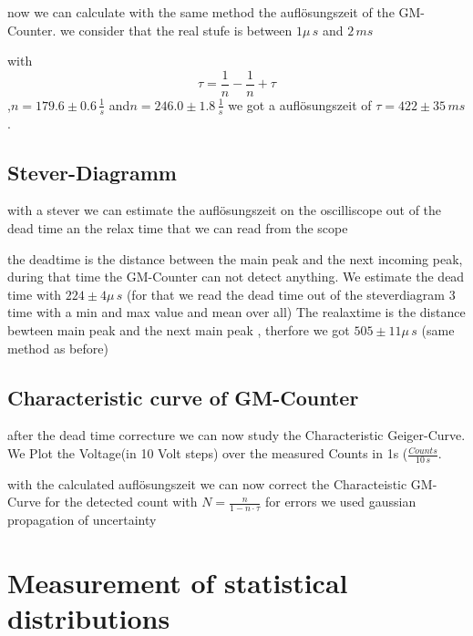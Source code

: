 now we can calculate with the same method the auflösungszeit of the GM-Counter.
we consider that the real stufe is between $1\mu\,s$ and $2\,ms$ 

with 
\begin{equation}
\tau =\frac{1}{n}-\frac{1}{n}+\tau
\end{equation}
 ,$n=179.6\pm0.6\,\frac{1}{s}$ and$n=246.0\pm1.8\,\frac{1}{s}$ we got a auflösungszeit of $\tau=422\pm35\,ms $
.
\subsection{Stever-Diagramm}

with a stever we  can estimate the auflösungszeit on the oscilliscope out of the dead time an the relax time that we can read from the scope 

the deadtime is the distance between the main peak and the next incoming peak, during that time the GM-Counter can not detect anything.
 We estimate the dead time with $224\pm4\mu\,s$ (for that we read the dead time out of the steverdiagram 3 time with a min and max value and mean over all)
 The realaxtime is the distance bewteen main peak and the next main peak , therfore we got  $505\pm11\mu\,s$ (same method as before)  
 
\subsection{Characteristic curve of GM-Counter}
after the dead time correcture we can now study the Characteristic Geiger-Curve.
We Plot the Voltage(in 10 Volt steps) over the measured Counts in 1s ($\frac{Counts}{10\,s}$.

with the calculated auflösungszeit we can now correct the Characteistic GM-Curve for the detected count with $N =\frac{n}{1-n\cdot\tau}$ 
for errors we used gaussian propagation of uncertainty 





\section{Measurement of statistical distributions}

